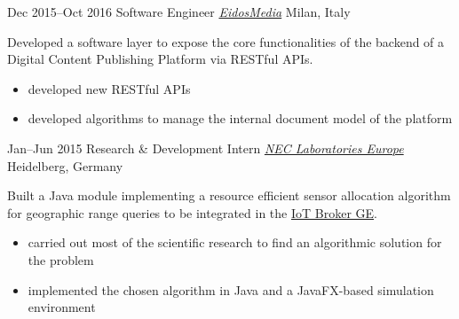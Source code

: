 \begin{entrylist}
\entry
{Dec 2015--Oct 2016}
{Software Engineer {\normalfont \emph{\href{https://www.eidosmedia.com/}{EidosMedia}}}}
{Milan, Italy}
{Developed a software layer to expose the core functionalities of the backend of a Digital Content Publishing Platform via RESTful APIs.  
\vspace{-.2cm}
\begin{itemize}[leftmargin=.6cm] 
	\item developed new RESTful APIs  
	\item developed algorithms to manage the internal document model of the platform
\end{itemize}
}

\entry
{Jan--Jun 2015}
{Research \& Development Intern {\normalfont \emph{\href{https://uk.nec.com/}{NEC Laboratories Europe}}}}
{Heidelberg, Germany}
{Built a Java module implementing a resource efficient sensor allocation algorithm for geographic range queries to be integrated in the \href{https://github.com/Aeronbroker/Aeron}{IoT Broker GE}.
\vspace{-.2cm}
\begin{itemize}[leftmargin=.6cm]
	\item carried out most of the scientific research to find an algorithmic solution for the problem
	\item implemented the chosen algorithm in Java and a JavaFX-based simulation environment
\end{itemize}
}


\end{entrylist}


